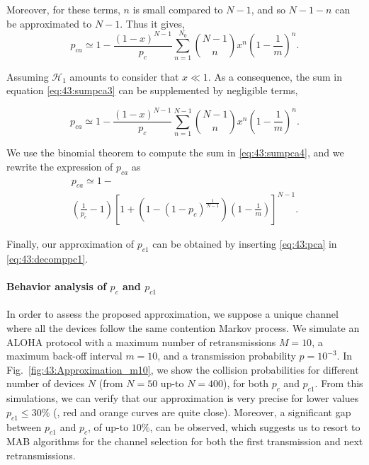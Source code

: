 Moreover, for these terms, $n$ is small compared to $N-1$, and so $N-1-n$ can be approximated to $N-1$. Thus it gives,
%
\begin{equation}\label{eq:43:sumpca3}
	p_{ca} \simeq  1- \frac{\left(1-x\right)^{N-1}}{p_c}\sum_{n=1}^{N_0}{N-1 \choose n} x^n \left( 1-\frac{1}{m}\right)^n.
\end{equation}

Assuming $\mathcal{H}_{1}$ amounts to consider that $x\ll 1$. As a consequence, the sum in equation \eqref{eq:43:sumpca3} can be supplemented by negligible terms,

\begin{equation}\label{eq:43:sumpca4}
	p_{ca} \simeq  1 - \frac{\left(1-x\right)^{N-1}}{p_c}\sum_{n=1}^{N-1}{N-1 \choose n} x^n \left( 1-\frac{1}{m}\right)^n.
\end{equation}

We use the binomial theorem to compute the sum in \eqref{eq:43:sumpca4}, and we rewrite the expression of $p_{ca}$ as
\begin{multline}\label{eq:43:pca}
	p_{ca} \simeq 1 -\\
	\left(\frac{1}{p_c}-1\right)\left[ 1+\left(1-\left(1-p_c\right)^{\frac{1}{N-1}}\right)\left(1-\frac{1}{m}\right)\right]^{N-1}.
\end{multline}

Finally, our approximation of $p_{c1}$ can be obtained by inserting \eqref{eq:43:pca} in \eqref{eq:43:decomppc1}.



\paragraph{Behavior analysis of $p_{c}$ and $p_{c1}$}\label{sub:43:numericalValidationPC1PC}

In order to assess the proposed approximation, we suppose a unique channel where all the devices follow the same contention Markov process.
We simulate an ALOHA protocol with a maximum number of retransmissions $M=10$, a maximum back-off interval $m=10$, and a transmission probability $p=10^{-3}$.
%
In Fig.~\ref{fig:43:Approximation_m10}, we show the collision probabilities for different number of devices $N$ (from $N=50$ up-to $N=400$), for both $p_{c}$ and $p_{c1}$.
%
From this simulations, we can verify that our approximation is very precise for lower values $p_{c1} \leq 30 \%$ (\ie, red and orange curves are quite close).
Moreover, a significant gap between $p_{c1}$ and $p_c$,
of up-to $10\%$, can be observed,
which suggests us to resort to MAB algorithms for the channel selection for both the first transmission and next retransmissions.

